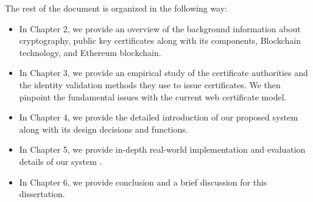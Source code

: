 The rest of the document is organized in the following way:
\begin{itemize}

 \item In Chapter 2, we provide an overview of the background information about cryptography, public key certificates along with its components, Blockchain technology, and Ethereum blockchain.
 
 \item  In Chapter 3, we provide an empirical study of the certificate authorities and the identity validation methods they use to issue certificates. We then pinpoint the fundamental issues with the current web certificate model. 
 
 \item  In Chapter 4, we provide the detailed introduction of our proposed system \Ghazalstar along with its design decisions and functions.

\item In Chapter 5, we provide in-depth real-world implementation and evaluation details of our system \Ghazalstar. 

\item In Chapter 6, we provide conclusion and a brief discussion for this dissertation.



\end{itemize}






